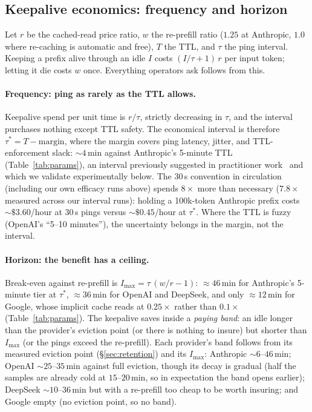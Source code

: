 \documentclass[10pt,twocolumn]{article}
\begin{document}
\subsection{Keepalive economics: frequency and horizon}
\label{sec:economics}
Let $r$ be the cached-read price ratio, $w$ the re-prefill ratio ($1.25$ at
Anthropic, $1.0$ where re-caching is automatic and free), $T$ the TTL, and
$\tau$ the ping interval. Keeping a prefix alive through an idle $I$ costs
$(I/\tau + 1)\,r$ per input token; letting it die costs $w$ once. Everything
operators ask follows from this.

\paragraph{Frequency: ping as rarely as the TTL allows.}
Keepalive spend per unit time is $r/\tau$, strictly decreasing in $\tau$, and
the interval purchases nothing except TTL safety. The economical interval is
therefore $\tau^{\ast} = T - \mathrm{margin}$, where the margin covers ping
latency, jitter, and TTL-enforcement slack: ${\sim}4$\,min against Anthropic's
5-minute TTL (Table~\ref{tab:params}), an interval previously suggested in
practitioner work~\cite{veritas-coffee,openclaw-keepalive} and which we
validate experimentally below. The 30\,s convention in circulation
(including our own efficacy runs above) spends $8\times$ more than necessary
($7.8\times$ measured across our interval runs): holding a 100k-token Anthropic
prefix costs ${\sim}\$3.60$/hour at 30\,s pings versus ${\sim}\$0.45$/hour at
$\tau^{\ast}$. Where the TTL is fuzzy (OpenAI's
``5--10 minutes''), the uncertainty belongs in the margin, not the interval.

\paragraph{Horizon: the benefit has a ceiling.}
Break-even against re-prefill is $I_{\max} = \tau\,(w/r - 1)$:
${\approx}46$\,min for Anthropic's 5-minute tier at $\tau^{\ast}$,
${\approx}36$\,min for OpenAI and DeepSeek, and only ${\approx}12$\,min for
Google, whose implicit cache reads at $0.25\times$ rather than $0.1\times$
(Table~\ref{tab:params}). The keepalive saves inside a \emph{paying band}: an idle longer than the
provider's eviction point (or there is nothing to insure) but shorter than
$I_{\max}$ (or the pings exceed the re-prefill). Each provider's band follows
from its measured eviction point (\S\ref{sec:retention}) and its $I_{\max}$:
Anthropic ${\sim}6$--$46$\,min; OpenAI ${\sim}25$--$35$\,min against full
eviction, though its decay is gradual (half the samples are already cold at
$15$--$20$\,min, so in expectation the band opens earlier); DeepSeek
${\sim}10$--$36$\,min but with a re-prefill too cheap to be worth insuring; and
Google empty (no eviction point, so no band).
\end{document}
